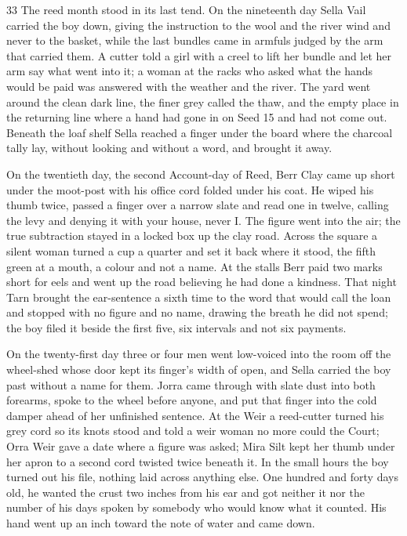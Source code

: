 \begin{CRchronicle}{33}
The reed month stood in its last tend. On the nineteenth day Sella Vail carried the boy down, giving the instruction to the wool and the river wind and never to the basket, while the last bundles came in armfuls judged by the arm that carried them. A cutter told a girl with a creel to lift her bundle and let her arm say what went into it; a woman at the racks who asked what the hands would be paid was answered with the weather and the river. The yard went around the clean dark line, the finer grey called the thaw, and the empty place in the returning line where a hand had gone in on Seed 15 and had not come out. Beneath the loaf shelf Sella reached a finger under the board where the charcoal tally lay, without looking and without a word, and brought it away.

On the twentieth day, the second Account-day of Reed, Berr Clay came up short under the moot-post with his office cord folded under his coat. He wiped his thumb twice, passed a finger over a narrow slate and read one in twelve, calling the levy and denying it with your house, never I. The figure went into the air; the true subtraction stayed in a locked box up the clay road. Across the square a silent woman turned a cup a quarter and set it back where it stood, the fifth green at a mouth, a colour and not a name. At the stalls Berr paid two marks short for eels and went up the road believing he had done a kindness. That night Tarn brought the ear-sentence a sixth time to the word that would call the loan and stopped with no figure and no name, drawing the breath he did not spend; the boy filed it beside the first five, six intervals and not six payments.

On the twenty-first day three or four men went low-voiced into the room off the wheel-shed whose door kept its finger’s width of open, and Sella carried the boy past without a name for them. Jorra came through with slate dust into both forearms, spoke to the wheel before anyone, and put that finger into the cold damper ahead of her unfinished sentence. At the Weir a reed-cutter turned his grey cord so its knots stood and told a weir woman no more could the Court; Orra Weir gave a date where a figure was asked; Mira Silt kept her thumb under her apron to a second cord twisted twice beneath it. In the small hours the boy turned out his file, nothing laid across anything else. One hundred and forty days old, he wanted the crust two inches from his ear and got neither it nor the number of his days spoken by somebody who would know what it counted. His hand went up an inch toward the note of water and came down.
\end{CRchronicle}
